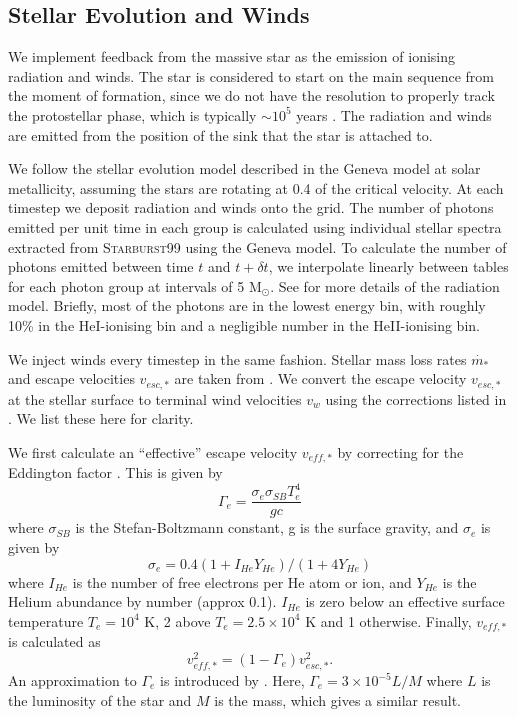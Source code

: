 \documentclass[a4paper,fleqn,usenatbib]{mnras}
\newcommand{\Msolar}{M$_{\odot}$\xspace}
\begin{document}
\subsection{Stellar Evolution and Winds}

We implement feedback from the massive star as the emission of ionising radiation and winds. The star is considered to start on the main sequence from the moment of formation, since we do not have the resolution to properly track the protostellar phase, which is typically $\sim 10^5$ years \citep{Hosokawa2009}. The radiation and winds are emitted from the position of the sink that the star is attached to.

We follow the stellar evolution model described in the Geneva model \citep{Ekstrom2012} at solar metallicity, assuming the stars are rotating at 0.4 of the critical velocity. At each timestep we deposit radiation and winds onto the grid. The number of photons emitted per unit time in each group is calculated using individual stellar spectra extracted from \textsc{Starburst99} \citep{Leitherer2014} using the Geneva model. To calculate the number of photons emitted between time $t$ and $t+\delta t$, we interpolate linearly between tables for each photon group at intervals of 5 \Msolar. See \cite{Geen2018} for more details of the radiation model. Briefly, most of the photons are in the lowest energy bin, with roughly 10\% in the HeI-ionising bin and a negligible number in the HeII-ionising bin.

We inject winds every timestep in the same fashion. Stellar mass loss rates $\dot{m_*}$ and escape velocities $v_{esc,*}$ are taken from \citet{Ekstrom2012}. We convert the escape velocity $v_{esc,*}$ at the stellar surface to terminal wind velocities $v_w$ using the corrections listed in \citet{Gatto2017}. We list these here for clarity.

We first calculate an ``effective'' escape velocity $v_{eff,*}$ by correcting for the Eddington factor \citep[e.g.][]{Vink2011}. This is given by
\begin{equation}
\Gamma_e = \frac{\sigma_e \sigma_{SB} T_e^4}{g c}
\end{equation}
where $\sigma_{SB}$ is the Stefan-Boltzmann constant, g is the surface gravity, and $\sigma_e$ is given by
\begin{equation}
\sigma_{e}= 0.4 (1 + I_{He}Y_{He}) / (1 + 4 Y_{He})
\end{equation}
where $I_{He}$ is the number of free electrons per He atom or ion, and $Y_{He}$  is the Helium abundance by number (approx 0.1). $I_{He}$ is zero below an effective surface temperature $T_e = 10^4$ K, 2 above $T_e = 2.5\times10^4$ K and 1 otherwise. Finally, $v_{eff,*}$ is calculated as
\begin{equation}
v_{eff,*}^2  =  (1 - \Gamma_e) v_{esc,*}^2.
\end{equation}
An approximation to $\Gamma_e$ is introduced by \citet{Vink2011}. Here, $\Gamma_e = 3\times10^{-5} L / M$ where $L$ is the luminosity of the star and $M$ is the mass, which gives a similar result.
\end{document}
